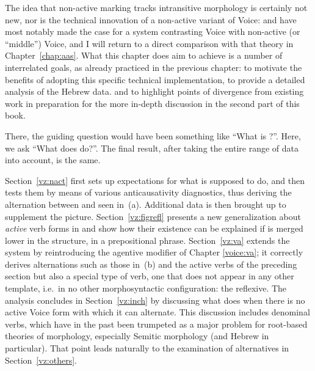 The idea that non-active marking tracks intransitive morphology is certainly not new, nor is the technical innovation of a non-active variant of Voice: \cite{schaefer08} and \cite{layering15} have most notably made the case for a system contrasting Voice with non-active (or ``middle'') Voice, and I will return to a direct comparison with that theory in Chapter~\ref{chap:aas}. What this chapter does aim to achieve is a number of interrelated goals, as already practiced in the previous chapter: to motivate the benefits of adopting this specific technical implementation, to provide a detailed analysis of the Hebrew data. and to highlight points of divergence from existing work in preparation for the more in-depth discussion in the second part of this book.


There, the guiding question would have been something like ``What is {\tnif}?''. Here, we ask ``What does {\vz} do?''. The final result, after taking the entire range of data into account, is the same.

Section~\ref{vz:nact} first sets up expectations for what {\vz} is supposed to do, and then tests them by means of various anticausativity diagnostics, thus deriving the alternation between {\tkal} and {\tnif} seen in~(\lastx a). Additional data is then brought up to supplement the picture. Section~\ref{vz:figrefl} presents a new generalization about \emph{active} verb forms in {\tnif} and show how their existence can be explained if {\vz} is merged lower in the structure, in a prepositional phrase. Section~\ref{vz:va} extends the system by reintroducing the agentive modifier {\va} of Chapter \ref{voice:va}; it correctly derives alternations such as those in~(\lastx b) and the active verbs of the preceding section but also a special type of verb, one that does not appear in any other template, i.e.~in no other morphosyntactic configuration: the reflexive. The analysis concludes in Section~\ref{vz:inch} by discussing what {\vz} does when there is no active Voice form with which it can alternate. This discussion includes denominal verbs, which have in the past been trumpeted as a major problem for root-based theories of morphology, especially Semitic morphology (and Hebrew in particular). That point leads naturally to the examination of alternatives in Section~\ref{vz:others}.


